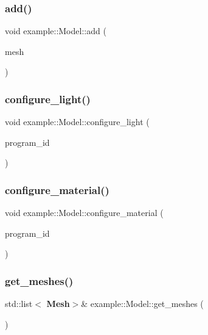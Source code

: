 \subsubsection{add()}
{\footnotesize\ttfamily void example\+::\+Model\+::add (\begin{DoxyParamCaption}\item[{const std\+::shared\+\_\+ptr$<$ \textbf{ Mesh} $>$ \&}]{mesh }\end{DoxyParamCaption})\hspace{0.3cm}{\ttfamily [inline]}}

\mbox{\label{classexample_1_1_model_a6700d419bbf173440144f9ba7f3e997f}} 
\subsubsection{configure\_light()}
{\footnotesize\ttfamily void example\+::\+Model\+::configure\+\_\+light (\begin{DoxyParamCaption}\item[{G\+Luint}]{program\+\_\+id }\end{DoxyParamCaption})\hspace{0.3cm}{\ttfamily [inline]}}

\mbox{\label{classexample_1_1_model_a438576932520d48805283194da85d5d5}} 
\subsubsection{configure\_material()}
{\footnotesize\ttfamily void example\+::\+Model\+::configure\+\_\+material (\begin{DoxyParamCaption}\item[{G\+Luint}]{program\+\_\+id }\end{DoxyParamCaption})\hspace{0.3cm}{\ttfamily [inline]}}

\mbox{\label{classexample_1_1_model_adf068cfc1a2f769334401d02881a4924}} 
\subsubsection{get\_meshes()}
{\footnotesize\ttfamily std\+::list$<$\textbf{ Mesh}$>$\& example\+::\+Model\+::get\+\_\+meshes (\begin{DoxyParamCaption}{ }\end{DoxyParamCaption})\hspace{0.3cm}{\ttfamily [inline]}}


